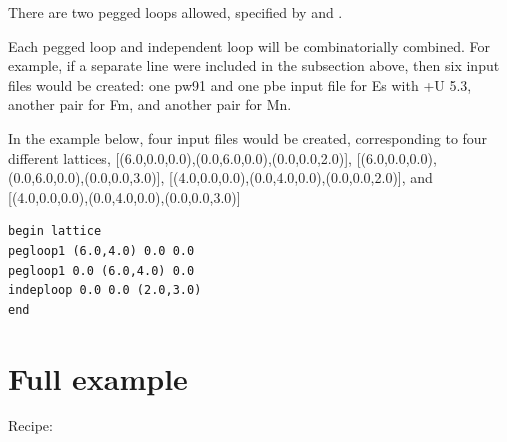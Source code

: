 \documentclass[letterpaper,10pt,english]{sphinxmanual}
\begin{document}
There are two pegged loops allowed, specified by  and .

Each pegged loop and independent loop will be combinatorially combined. For example, if a separate line  were included in the  subsection above, then six input files would be created: one pw91 and one pbe input file for Es with +U 5.3, another pair for Fm, and another pair for Mn.

In the example below, four input files would be created, corresponding to four different lattices, {[}(6.0,0.0,0.0),(0.0,6.0,0.0),(0.0,0.0,2.0){]}, {[}(6.0,0.0,0.0),(0.0,6.0,0.0),(0.0,0.0,3.0){]}, {[}(4.0,0.0,0.0),(0.0,4.0,0.0),(0.0,0.0,2.0){]}, and {[}(4.0,0.0,0.0),(0.0,4.0,0.0),(0.0,0.0,3.0){]}

\begin{Verbatim}[commandchars=\\\{\}]
begin lattice
pegloop1 (6.0,4.0) 0.0 0.0
pegloop1 0.0 (6.0,4.0) 0.0
indeploop 0.0 0.0 (2.0,3.0)
end
\end{Verbatim}


\section{Full example}
\label{3_0_inputfile:full-example}
Recipe:
\end{document}

